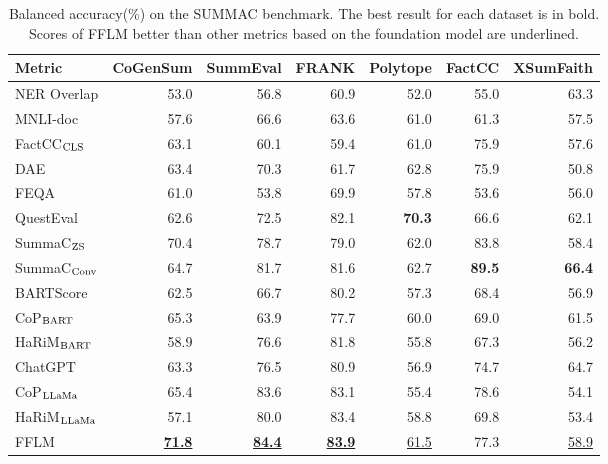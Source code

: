 \begin{table}[t]
	\scriptsize
	\centering
	\begin{tabular}{l|rrrrrr}
		\toprule[1pt]
		Metric & CoGenSum & SummEval & FRANK & Polytope & FactCC & XSumFaith \\
		\hline
		NER Overlap & 53.0 & 56.8 & 60.9 & 52.0 & 55.0 & 63.3 \\
		MNLI-doc &  57.6 & 66.6 & 63.6 & 61.0 &61.3 & 57.5 \\
		FactCC$_{\rm CLS}$ & 63.1 & 60.1 & 59.4 & 61.0 & 75.9 & 57.6 \\
		DAE & 63.4 & 70.3 & 61.7 & {62.8} & 75.9 & 50.8 \\
		FEQA & 61.0 & 53.8 & 69.9 & 57.8 & 53.6 & 56.0 \\
		QuestEval & 62.6 & 72.5 & 82.1  & \textbf{70.3} & 66.6 & 62.1 \\
		SummaC$_{\rm ZS}$ &70.4 & 78.7& 79.0& 62.0&83.8 &58.4  \\
		SummaC$_{\rm Conv}$ & 64.7&81.7 &81.6 &62.7 &\textbf{89.5} &\textbf{66.4} \\
		BARTScore & 62.5& 66.7&80.2 & 57.3& 68.4 & 56.9\\
		CoP$_{\rm BART}$ &  65.3 & 63.9 & 77.7 & 60.0 & 69.0 & 61.5\\
		HaRiM$_{\rm BART}$ & 58.9 &76.6 &81.8 &55.8 &67.3 &56.2\\
		ChatGPT &63.3 & 76.5& 80.9& 56.9& 74.7& {64.7}\\
		\hline
		CoP$_{\rm LLaMa}$ & 65.4 & 83.6 & 83.1 & 55.4 & 78.6 & 54.1 \\
		HaRiM$_{\rm LLaMa}$ & 57.1 & 80.0 & 83.4 & 58.8 & 69.8 & 53.4 \\
		FFLM & \underline{\textbf{71.8}} & \underline{\textbf{84.4}} & \underline{\textbf{83.9}} & \underline{61.5} &77.3  &\underline{58.9} \\
		\bottomrule[1pt]
	\end{tabular}
	\caption{Balanced accuracy(\%) on the SUMMAC benchmark. The best result for each dataset is in bold. Scores of FFLM better than other metrics based on the foundation model are underlined.}
	\label{tab:classification}
\end{table}




